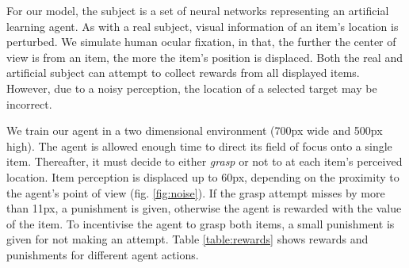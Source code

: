 \documentclass[11]{article}
\begin{document}
For our model, the subject is a set of neural networks representing an artificial learning agent. 
As with a real subject, visual information of an item's location is perturbed. 
We simulate human ocular fixation, in that, the further the center of view is from an item, the more the item's position is displaced. 
Both the real and artificial subject can attempt to collect rewards from all displayed items. 
However, due to a noisy perception, the location of a selected target may be incorrect. 

We train our agent in a two dimensional environment (700px wide and 500px high). 
The agent is allowed enough time to direct its field of focus onto a single item.
Thereafter, it must decide to either \textit{grasp} or not to at each item's perceived location.
Item perception is displaced up to 60px, depending on the proximity to the agent's point of view (fig. \ref{fig:noise}).
If the grasp attempt misses by more than 11px, a punishment is given, otherwise the agent is rewarded with the value of the item. 
To incentivise the agent to grasp both items, a small punishment is given for not making an attempt.
Table \ref{table:rewards} shows rewards and punishments for different agent actions.
\end{document}
